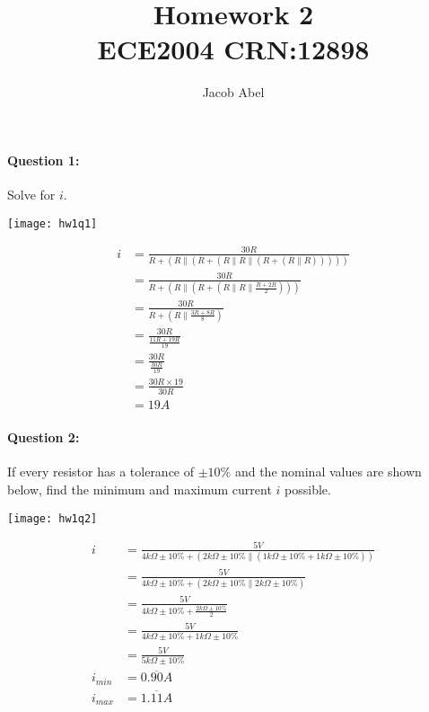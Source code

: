 \documentclass[12pt,letterpaper,titlepage]{article}
\author{Jacob Abel}
\title{	Homework 2
	\\\large ECE2004 CRN:12898
}
\begin{document}
\maketitle

\begin{raggedright}

\paragraph{Question 1: }

Solve for $i$.

\begin{center}
\texttt{[image: hw1q1]}
\end{center}

\begin{align*}
   i &= \frac{30R}{R + (R \parallel ( R + (R \parallel R \parallel (R + ( R \parallel R)))))}
\\   &= \frac{30R}{R + (R \parallel ( R + (R \parallel R \parallel \frac{R+2R}{2})))}
\\   &= \frac{30R}{R + (R \parallel \frac{3R+8R}{8})}
\\   &= \frac{30R}{\frac{11R+19R}{19}}
\\   &= \frac{30R}{\frac{30R}{19}}
\\   &= \frac{30R\times19}{30R}
\\   &= 19A
\end{align*}

\clearpage

\paragraph{Question 2: }

If every resistor has a tolerance of $\pm 10\%$ and the nominal values are shown below, find the minimum and maximum current $i$ possible.

\begin{center}
\texttt{[image: hw1q2]}
\end{center}
\begin{align*}
    i &= \frac{5V}{4 k\Omega \pm 10\% + (2 k\Omega \pm 10\% \parallel (1 k\Omega \pm 10\% + 1 k\Omega \pm 10\%))}
\\    &= \frac{5V}{4 k\Omega \pm 10\% + (2 k\Omega \pm 10\% \parallel 2 k\Omega \pm 10\%)}
\\    &= \frac{5V}{4 k\Omega \pm 10\% + \frac{2 k\Omega \pm 10\%}{2}}
\\    &= \frac{5V}{4 k\Omega \pm 10\% + 1 k\Omega \pm 10\%}
\\    &= \frac{5V}{5 k\Omega \pm 10\%}
\\ i_{min} &= 0.\overline{90}A
\\ i_{max} &= 1.\overline{11}A
\end{align*}


\end{raggedright}
\end{document}
